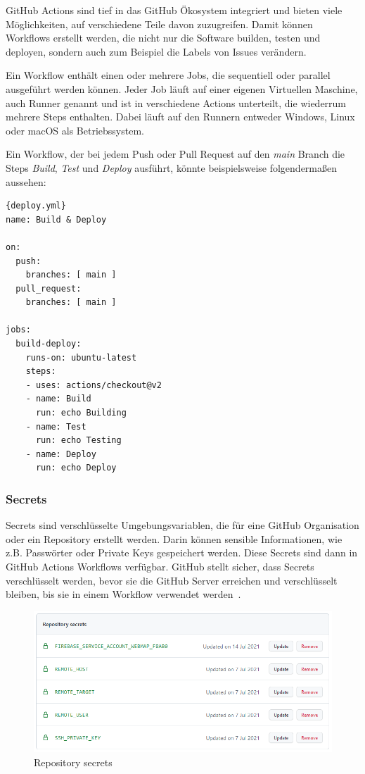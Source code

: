 GitHub Actions sind tief in das GitHub Ökosystem integriert und bieten viele Möglichkeiten,
auf verschiedene Teile davon zuzugreifen.
 Damit können Workflows erstellt werden, die nicht nur die Software builden, testen und deployen, sondern auch
 zum Beispiel die Labels von Issues verändern.

Ein Workflow enthält einen oder mehrere Jobs, die sequentiell oder parallel ausgeführt werden
können.
 Jeder Job läuft auf einer eigenen Virtuellen Maschine, auch Runner genannt und ist in
verschiedene Actions unterteilt, die wiederrum mehrere Steps enthalten.
 Dabei läuft
auf den Runnern entweder Windows, Linux oder macOS als Betriebssystem.

Ein Workflow, der bei jedem Push oder Pull Request auf den \textit{main} Branch die Steps
\textit{Build}, \textit{Test} und \textit{Deploy} ausführt, könnte beispielsweise folgendermaßen
aussehen: ~\cite{github-actions}

\begin{lstlisting}[label={lst:deploy.yml}]{deploy.yml}
name: Build & Deploy

on:
  push:
    branches: [ main ]
  pull_request:
    branches: [ main ]

jobs:
  build-deploy:
    runs-on: ubuntu-latest
    steps:
    - uses: actions/checkout@v2
    - name: Build
      run: echo Building
    - name: Test
      run: echo Testing
    - name: Deploy
      run: echo Deploy
\end{lstlisting}

\subsubsection{Secrets}
Secrets sind verschlüsselte Umgebungsvariablen, die für eine GitHub Organisation oder ein
Repository erstellt werden.
Darin können sensible Informationen, wie z.B. Passwörter oder Private Keys gespeichert werden.
Diese Secrets sind dann in GitHub Actions Workflows verfügbar.
GitHub stellt sicher, dass Secrets verschlüsselt werden, bevor sie die GitHub Server erreichen
und verschlüsselt bleiben, bis sie in einem Workflow verwendet werden~\cite{github-secrets}.

\begin{figure}[hbt!]
    \centering
    \includegraphics[scale=0.5]{pics/secrets.png}
    \caption{Repository secrets}
\end{figure}

